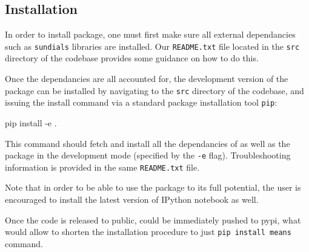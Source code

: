 \subsection{Installation}

In order to install \means{} package, one must first make sure all external dependancies such as \verb"sundials" libraries \cite{hindmarsh_sundials_2005} are installed. 
Our \verb"README.txt" file located in the \verb"src" directory of the codebase provides some guidance on how to do this.

Once the dependancies are all accounted for, the development version of the \means{} package can be installed by navigating to the \verb"src" directory of the codebase, and issuing the install command via a standard \py{} package installation tool \verb"pip":

\begin{InputVerbatim}
pip install -e .
\end{InputVerbatim}

This command should fetch and install all the dependancies of \means{} as well as the package in the development mode (specified by the \verb"-e" flag). 
Troubleshooting information is provided in the same \verb"README.txt" file.

Note that in order to be able to use the \means{} package to its full potential, the user is encouraged to install the latest version of  IPython notebook\cite{perez_ipython:_2007} as well.

Once the code is released to public, \means{} could be immediately pushed to \gls{pypi}, what would allow to shorten the installation procedure to just \verb"pip install means" command.

{   %

    
    
    
    
}   %

